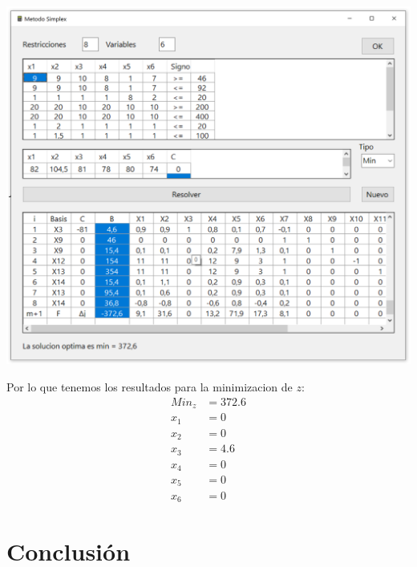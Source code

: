 \documentclass[10pt,letterpaper]{book}
\begin{document}
\begin{center}
\includegraphics[scale=0.55]{Programa7}
\end{center}
Por lo que tenemos los resultados para la minimizacion de $z$:
\begin{align*}
Min_z &= 372.6 \\ 
x_1   &= 0  \\
x_2   &= 0  \\
x_3   &= 4.6  \\
x_4   &= 0  \\
x_5   &= 0  \\
x_6   &= 0  
\end{align*}

\section*{Conclusión}
\end{document}
